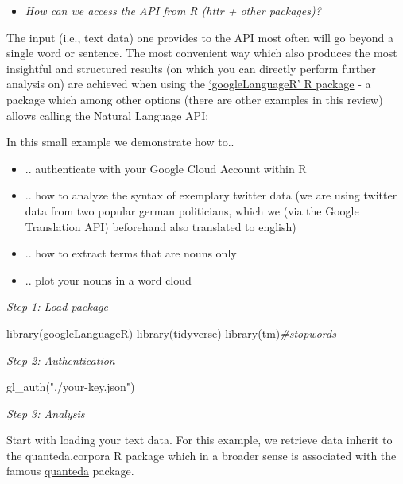 \documentclass[
]{book}
\newenvironment{Shaded}{\begin{snugshade}}{\end{snugshade}}
\newcommand{\CommentTok}[1]{\textcolor[rgb]{0.56,0.35,0.01}{\textit{#1}}}
\newcommand{\FunctionTok}[1]{\textcolor[rgb]{0.00,0.00,0.00}{#1}}
\newcommand{\NormalTok}[1]{#1}
\newcommand{\StringTok}[1]{\textcolor[rgb]{0.31,0.60,0.02}{#1}}
\providecommand{\tightlist}{%
  \setlength{\itemsep}{0pt}\setlength{\parskip}{0pt}}
\begin{document}
\begin{itemize}
\tightlist
\item
  \emph{How can we access the API from R (httr + other packages)?}
\end{itemize}

The input (i.e., text data) one provides to the API most often will go beyond a single word or sentence. The most convenient way which also produces the most insightful and structured results (on which you can directly perform further analysis on) are achieved when using the \href{\%22https://cran.r-project.org/web/packages/googleLanguageR/index.html\%22}{`googleLanguageR' R package} - a package which among other options (there are other examples in this review) allows calling the Natural Language API:

In this small example we demonstrate how to..

\begin{itemize}
\item
  .. authenticate with your Google Cloud Account within R
\item
  .. how to analyze the syntax of exemplary twitter data (we are using twitter data from two popular german politicians, which we (via the Google Translation API)
  beforehand also translated to english)
\item
  .. how to extract terms that are nouns only
\item
  .. plot your nouns in a word cloud
\end{itemize}

\emph{Step 1: Load package}

\begin{Shaded}
\begin{Highlighting}[]
\FunctionTok{library}\NormalTok{(googleLanguageR)}
\FunctionTok{library}\NormalTok{(tidyverse)}
\FunctionTok{library}\NormalTok{(tm)}\CommentTok{\#stopwords}
\end{Highlighting}
\end{Shaded}

\emph{Step 2: Authentication}

\begin{Shaded}
\begin{Highlighting}[]
\FunctionTok{gl\_auth}\NormalTok{(}\StringTok{"./your{-}key.json"}\NormalTok{)}
\end{Highlighting}
\end{Shaded}

\emph{Step 3: Analysis}

Start with loading your text data. For this example, we retrieve data inherit to the quanteda.corpora R package which in a broader sense is associated with the famous \href{\%22https://quanteda.io/\%22}{quanteda} package.
\end{document}
